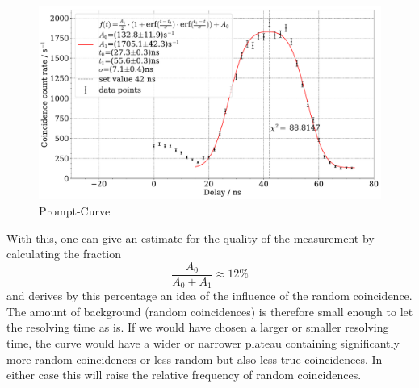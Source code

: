 \documentclass[11pt,a4paper,notitlepage]{scrartcl}
\begin{document}
\begin{figure}[H]
	\centering
	\includegraphics[width=\linewidth]{figs/prompt/prompt.pdf}
	\caption{Prompt-Curve}\label{fig:prompt}
\end{figure}
With this, one can give an estimate for the quality of the measurement by calculating the fraction
$$\frac{A_0}{A_0+A_1}\approx 12\%$$
and derives by this percentage an idea of the influence of the random coincidence. The amount of background (random coincidences) is therefore small enough to let the resolving time as is. If we would have chosen a larger or smaller resolving time, the curve would have a wider or narrower plateau containing significantly more random coincidences or less random but also less true coincidences. In either case this will raise the relative frequency of random coincidences.
\end{document}
